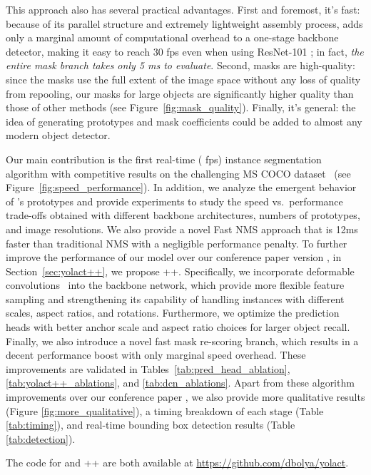 \documentclass[10pt,journal,compsoc]{IEEEtran}
\begin{document}
This approach also has several practical advantages. First and foremost, it's fast: because of its parallel structure and extremely lightweight assembly process, \methodname{} adds only a marginal amount of computational overhead to a one-stage backbone detector, making it easy to reach 30 fps even when using ResNet-101 \cite{resnet}; in fact, \emph{the entire mask branch takes only 5 ms to evaluate}. Second, masks are high-quality: since the masks use the full extent of the image space without any loss of quality from repooling, our masks for large objects are significantly higher quality than those of other methods (see Figure~\ref{fig:mask_quality}). Finally, it's general: the idea of generating prototypes and mask coefficients could be added to almost any modern object detector.

Our main contribution is the first real-time ( fps) instance segmentation algorithm with competitive results on the challenging MS COCO dataset~\cite{coco} (see Figure~\ref{fig:speed_performance}). In addition, we analyze the emergent behavior of \methodname{}'s prototypes and provide experiments to study the speed vs.~performance trade-offs obtained with different backbone architectures, numbers of prototypes, and image resolutions. We also provide a novel Fast NMS approach that is 12ms faster than traditional NMS with a negligible performance penalty. To further improve the performance of our model over our conference paper version \cite{yolact}, in Section~\ref{sec:yolact++}, we propose \methodname{}++. Specifically, we incorporate deformable convolutions~\cite{deformv1, deformv2} into the backbone network, which provide more flexible feature sampling and strengthening its capability of handling instances with different scales, aspect ratios, and rotations. Furthermore, we optimize the prediction heads with better anchor scale and aspect ratio choices for larger object recall. Finally, we also introduce a novel fast mask re-scoring branch, which results in a decent performance boost with only marginal speed overhead. These improvements are validated in Tables~\ref{tab:pred_head_ablation}, \ref{tab:yolact++_ablations}, and \ref{tab:dcn_ablations}.  Apart from these algorithm improvements over our conference paper \cite{yolact}, we also provide more qualitative results (Figure \ref{fig:more_qualitative}), a timing breakdown of each stage (Table \ref{tab:timing}), and real-time bounding box detection results (Table \ref{tab:detection}). 




The code for \methodname{} and \methodname++ are both available at \href{https://github.com/dbolya/yolact}{https://github.com/dbolya/yolact}.
\end{document}
